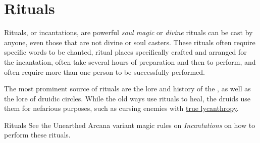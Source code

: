 \section{Rituals}
\label{sec:Rituals}

Rituals, or incantations, are powerful \emph{soul magic} or \emph{divine}
rituals can be cast by anyone, even those that are not divine or soul
casters. These rituals often require specific words to be chanted, ritual
places specifically crafted and arranged for the incantation, often take
several hours of preparation and then to perform, and often require more than
one person to be successfully performed.

The most prominent source of rituals are the lore and history of the
, as well as the lore of druidic circles. While the old
ways use rituals to heal, the druids use them for nefarious purposes, such as
cursing enemies with \hyperref[sec:True Lycanthropes]{true lycanthropy}.

\begin{35e}{Rituals}
  See the Unearthed Arcana variant magic rules on \emph{Incantations} on how
  to perform these rituals.
\end{35e}






